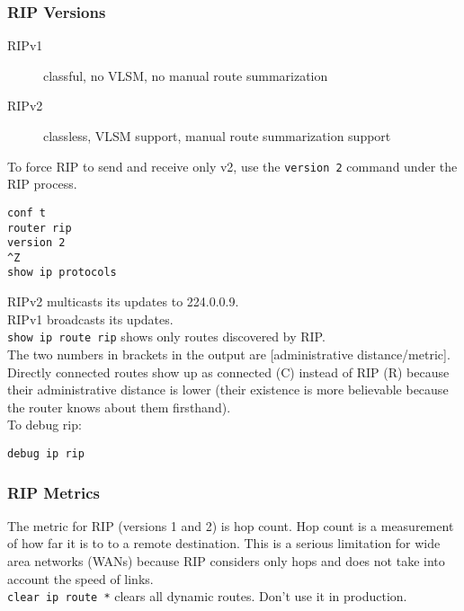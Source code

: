 \subsubsection{RIP Versions}

\begin{description}
\item[RIPv1]
classful, no VLSM, no manual route summarization
\item[RIPv2]
classless, VLSM support, manual route summarization support
\end{description}

To force RIP to send and receive only v2, use the \texttt{version 2}
command under the RIP process.

\begin{verbatim}
conf t
router rip
version 2
^Z
show ip protocols
\end{verbatim}

RIPv2 multicasts its updates to 224.0.0.9.\\

RIPv1 broadcasts its updates.\\

\texttt{show ip route rip} shows only routes discovered by RIP.\\

The two numbers in brackets in the output are [administrative distance/metric].\\

Directly connected routes show up as connected (C) instead of RIP (R) because
their administrative distance is lower (their existence is more believable
because the router knows about them firsthand).\\

To debug rip:

\begin{verbatim}
debug ip rip  
\end{verbatim}

\subsubsection{RIP Metrics}

The metric for RIP (versions 1 and 2) is hop count. Hop count is a measurement
of how far it is to to a remote destination. This is a serious limitation for
wide area networks (WANs) because RIP considers only hops and does not take
into account the speed of links.\\

\texttt{clear ip route *} clears all dynamic routes. Don't use it in
production.
